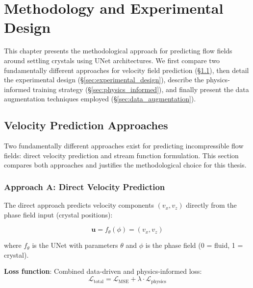 
\chapter{Methodology and Experimental Design}
\label{ch:methodology}

This chapter presents the methodological approach for predicting flow fields around settling crystals using UNet architectures. We first compare two fundamentally different approaches for velocity field prediction (\S\ref{sec:velocity_approaches}), then detail the experimental design (\S\ref{sec:experimental_design}), describe the physics-informed training strategy (\S\ref{sec:physics_informed}), and finally present the data augmentation techniques employed (\S\ref{sec:data_augmentation}).

\section{Velocity Prediction Approaches}
\label{sec:velocity_approaches}

Two fundamentally different approaches exist for predicting incompressible flow fields: direct velocity prediction and stream function formulation. This section compares both approaches and justifies the methodological choice for this thesis.

\subsection{Approach A: Direct Velocity Prediction}
\label{sec:direct_velocity}

The direct approach predicts velocity components $(v_x, v_z)$ directly from the phase field input (crystal positions):

\begin{equation}
\mathbf{u} = f_{\theta}(\phi) = (v_x, v_z)
\end{equation}

where $f_{\theta}$ is the UNet with parameters $\theta$ and $\phi$ is the phase field (0 = fluid, 1 = crystal).

\textbf{Loss function}: Combined data-driven and physics-informed loss:
\begin{equation}
\mathcal{L}_{\text{total}} = \mathcal{L}_{\text{MSE}} + \lambda \cdot \mathcal{L}_{\text{physics}}
\label{eq:loss_direct}
\end{equation}

